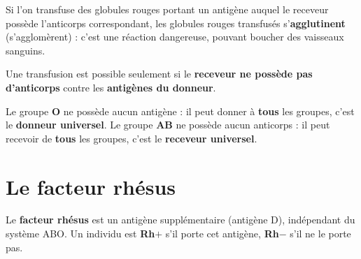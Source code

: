 \begin{propriete}
Si l'on transfuse des globules rouges portant un antigène auquel le receveur possède
l'anticorps correspondant, les globules rouges transfusés s'\textbf{agglutinent}
(s'agglomèrent) : c'est une réaction dangereuse, pouvant boucher des vaisseaux sanguins.
\end{propriete}

\begin{propriete}
Une transfusion est possible seulement si le \textbf{receveur ne possède pas
d'anticorps} contre les \textbf{antigènes du donneur}.
\end{propriete}

\begin{illus}
\end{illus}

\begin{propriete}
Le groupe \textbf{O} ne possède aucun antigène : il peut donner à \textbf{tous} les
groupes, c'est le \textbf{donneur universel}. Le groupe \textbf{AB} ne possède aucun
anticorps : il peut recevoir de \textbf{tous} les groupes, c'est le \textbf{receveur
universel}.
\end{propriete}

\section{Le facteur rhésus}

\begin{definition}
Le \textbf{facteur rhésus} est un antigène supplémentaire (antigène D), indépendant du
système ABO. Un individu est \textbf{Rh$+$} s'il porte cet antigène, \textbf{Rh$-$}
s'il ne le porte pas.
\end{definition}

